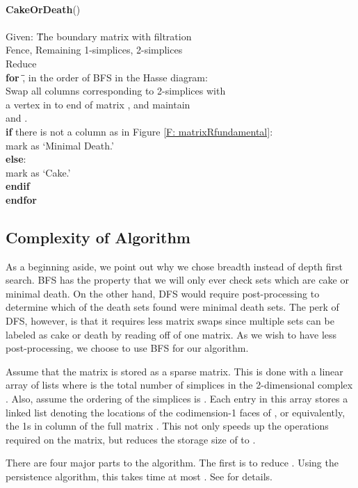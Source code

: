 \documentclass[10pt,twocolumn]{article} \usepackage{amsmath,epsf,amssymb,cite,pifont,amsthm, mathrsfs,epsfig,  bbm, amsthm,  setspace}
\renewcommand{\1}{\mathbbm{1}}
\begin{document}
\begin{tabbing}
\\
\textbf{CakeOrDeath}()\\
\\
Given: \= The boundary matrix  with filtration \\
\> Fence, Remaining 1-simplices, 2-simplices  \\
Reduce \\
\textbf{for} \=\=,  in the order of BFS in the Hasse diagram:\\
\>	Swap all columns corresponding to 2-simplices with\\
\>\>		a vertex in  to end of matrix , and maintain\\
\>\>		 and .\\
\>	\textbf{if} there is not a column as in Figure \ref{F: matrixRfundamental}:\\
\>\>		mark  as `Minimal Death.'\\
\>	\textbf{else}:\\
\>\>		mark  as `Cake.'\\
\>	\textbf{endif}\\
\textbf{endfor}
\end{tabbing}


\subsection{Complexity of Algorithm} \label{S: Complexity of Algorithm}
As a beginning aside, we point out why we chose breadth instead of depth first search.
BFS has the property that we will only ever check sets which are cake or minimal death.
On the other hand, DFS would require post-processing to determine which of the death sets  found were minimal death sets.
The perk of DFS, however, is that it requires less matrix swaps since multiple sets  can be labeled as cake or death by reading off of one matrix.
As we wish to have less post-processing, we choose to use BFS for our algorithm.

Assume that the matrix  is stored as a sparse matrix.
This is done with a linear array of lists  where  is the total number of simplices
in the 2-dimensional complex .
Also, assume the ordering of the simplices is
.
Each entry  in this array stores a linked list denoting the locations of the codimension-1 faces of , or equivalently, the 1s in column  of the full matrix .  This not only speeds up the operations required on the matrix, but reduces the storage size of  to .

There are four major parts to the algorithm.
The first is to reduce .
Using the persistence algorithm, this takes time at most .
See \cite{Edelsbrunner2010} for details.
\end{document}
